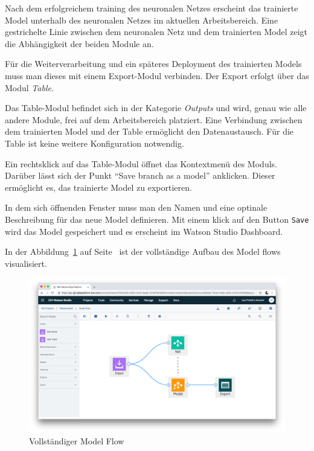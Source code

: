 Nach dem erfolgreichem training des neuronalen Netzes erscheint das trainierte Model unterhalb des neuronalen Netzes im
aktuellen Arbeitsbereich. Eine gestrichelte Linie zwischen dem neuronalen Netz und dem trainierten Model zeigt die
Abhängigkeit der beiden Module an.

Für die Weiterverarbeitung und ein späteres Deployment des trainierten Models muss man dieses mit einem Export-Modul
verbinden. Der Export erfolgt über das Modul \textit{Table}.

Das Table-Modul befindet sich in der Kategorie \textit{Outputs} und wird, genau wie alle andere Module, frei auf dem
Arbeitsbereich platziert. Eine Verbindung zwischen dem trainierten Model und der Table ermöglicht den Datenaustausch.
Für die Table ist keine weitere Konfiguration notwendig.

Ein rechtsklick auf das Table-Modul öffnet das Kontextmenü des Moduls. Darüber lässt sich der Punkt
\enquote{Save branch as a model} anklicken. Dieser ermöglicht es, das trainierte Model zu exportieren.

In dem sich öffnenden Fenster muss man den Namen und eine optinale Beschreibung für das neue Model definieren. Mit einem
klick auf den Button \texttt{Save} wird das Model gespeichert und es erscheint im Watson Studio Dashboard.

In der Abbildung~\ref{fig:umsetzung_model_flow} auf Seite~\pageref{fig:umsetzung_model_flow} ist der vollständige Aufbau
des Model flows visualisiert.

\begin{figure}[h]
    \centering
    \includegraphics[width=\textwidth]{images/kapitel_3/umsetzung_model_flow.png}
    \caption{Vollständiger Model Flow}
    \label{fig:umsetzung_model_flow}
\end{figure}

